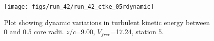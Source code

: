 \begin{figure}[H]
\centering
\texttt{[image: figs/run\_42/run\_42\_ctke\_05rdynamic]}
\caption{Plot showing dynamic variations in turbulent kinetic energy between 0 and 0.5 core radii. $z/c$=9.00, $V_{free}$=17.24, station 5.}
\label{fig:run_42_ctke_05rdynamic}
\end{figure}


